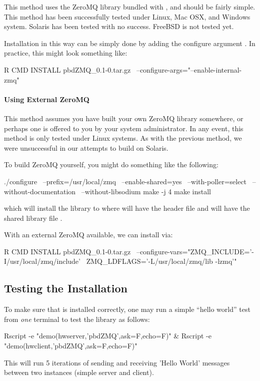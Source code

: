 This method uses the ZeroMQ library bundled with , and should be 
fairly simple.  This method has been successfully tested under Linux, Mac OSX, 
and Windows system. Solaris has been tested with no success. FreeBSD is 
not tested yet.

Installation in this way can be simply done by adding the configure argument 
.  In practice, this might look something like:
\begin{Command}
R CMD INSTALL pbdZMQ_0.1-0.tar.gz \
  --configure-args="--enable-internal-zmq"
\end{Command}


\paragraph{Using External ZeroMQ}

This method assumes you have built your own ZeroMQ library somewhere, or 
perhaps one is offered to you by your system administrator.  In any event, 
this method is only tested under Linux systems.  As with the previous method, 
we were unsuccessful in our attempts to build on Solaris.

To build ZeroMQ yourself, you might do something like the following:
\begin{Command}
./configure \
   --prefix=/usr/local/zmq \
   --enable-shared=yes \
   --with-poller=select \
   --without-documentation \
   --without-libsodium
make -j 4
make install
\end{Command}
which will install the library to  where
 will have the header file  and
 will have the shared library file .

With an external ZeroMQ available, we can install  via:
\begin{Command}
R CMD INSTALL pbdZMQ_0.1-0.tar.gz \
  --configure-vars="ZMQ_INCLUDE='-I/usr/local/zmq/include' \
                    ZMQ_LDFLAGS='-L/usr/local/zmq/lib -lzmq'"
\end{Command}



\subsection{Testing the Installation}

To make sure that \pkg{pbdZMQ} is installed correctly, one may run a simple 
``hello world'' test from {\em one} terminal to test the library as follows:
\begin{Command}
Rscript -e "demo(hwserver,'pbdZMQ',ask=F,echo=F)" &
Rscript -e "demo(hwclient,'pbdZMQ',ask=F,echo=F)"
\end{Command}
This will run 5 iterations of sending and receiving 'Hello World' messages 
between two instances (simple server and client).



